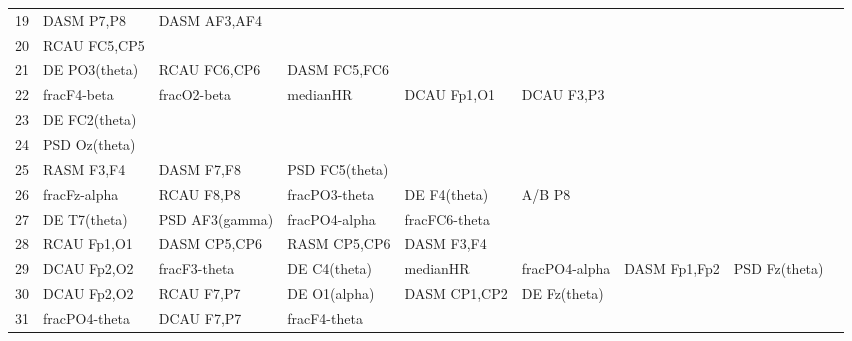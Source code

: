 \begin{landscape}
\begin{table}[]
\begin{tabular}{l|llllllll}
19                 & DASM P7,P8           & DASM AF3,AF4            &                      &                    &                       &                      &                 &                 \\
20                 & RCAU FC5,CP5         &                         &                      &                    &                       &                      &                 &                 \\
21                 & DE PO3(theta)        & RCAU FC6,CP6            & DASM FC5,FC6         &                    &                       &                      &                 &                 \\
22                 & fracF4-beta          & fracO2-beta             & medianHR             & DCAU Fp1,O1        & DCAU F3,P3            &                      &                 &                 \\
23                 & DE FC2(theta)        &                         &                      &                    &                       &                      &                 &                 \\
24                 & PSD Oz(theta)        &                         &                      &                    &                       &                      &                 &                 \\
25                 & RASM F3,F4           & DASM F7,F8              & PSD FC5(theta)       &                    &                       &                      &                 &                 \\
26                 & fracFz-alpha         & RCAU F8,P8              & fracPO3-theta        & DE F4(theta)       & A/B P8                &                      &                 &                 \\
27                 & DE T7(theta)         & PSD AF3(gamma)          & fracPO4-alpha        & fracFC6-theta      &                       &                      &                 &                 \\
28                 & RCAU Fp1,O1          & DASM CP5,CP6            & RASM CP5,CP6         & DASM F3,F4         &                       &                      &                 &                 \\
29                 & DCAU Fp2,O2          & fracF3-theta            & DE C4(theta)         & medianHR           & fracPO4-alpha         & DASM Fp1,Fp2         & PSD Fz(theta)   &                 \\
30                 & DCAU Fp2,O2          & RCAU F7,P7              & DE O1(alpha)         & DASM CP1,CP2       & DE Fz(theta)          &                      &                 &                 \\
31                 & fracPO4-theta        & DCAU F7,P7              & fracF4-theta         &                    &                       &                      &                 &                 \\
\end{tabular}
\end{table}
\end{landscape}

